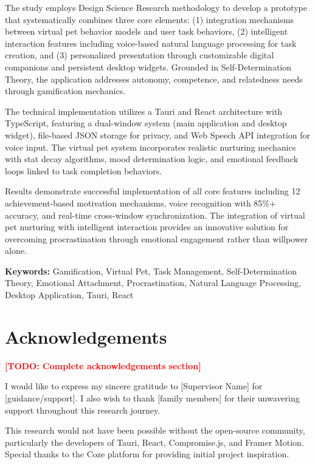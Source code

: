 \documentclass[12pt,a4paper]{report}
\newcommand{\todo}[1]{\textcolor{red}{\textbf{[TODO: #1]}}}
\begin{document}
The study employs Design Science Research methodology to develop a prototype that systematically combines three core elements: (1) integration mechanisms between virtual pet behavior models and user task behaviors, (2) intelligent interaction features including voice-based natural language processing for task creation, and (3) personalized presentation through customizable digital companions and persistent desktop widgets. Grounded in Self-Determination Theory, the application addresses autonomy, competence, and relatedness needs through gamification mechanics.

The technical implementation utilizes a Tauri and React architecture with TypeScript, featuring a dual-window system (main application and desktop widget), file-based JSON storage for privacy, and Web Speech API integration for voice input. The virtual pet system incorporates realistic nurturing mechanics with stat decay algorithms, mood determination logic, and emotional feedback loops linked to task completion behaviors.

Results demonstrate successful implementation of all core features including 12 achievement-based motivation mechanisms, voice recognition with 85\%+ accuracy, and real-time cross-window synchronization. The integration of virtual pet nurturing with intelligent interaction provides an innovative solution for overcoming procrastination through emotional engagement rather than willpower alone.

\textbf{Keywords:} Gamification, Virtual Pet, Task Management, Self-Determination Theory, Emotional Attachment, Procrastination, Natural Language Processing, Desktop Application, Tauri, React

\chapter*{Acknowledgements}

\todo{Complete acknowledgements section}

I would like to express my sincere gratitude to [Supervisor Name] for [guidance/support]. I also wish to thank [family members] for their unwavering support throughout this research journey.

This research would not have been possible without the open-source community, particularly the developers of Tauri, React, Compromise.js, and Framer Motion. Special thanks to the Coze platform for providing initial project inspiration.
\end{document}
